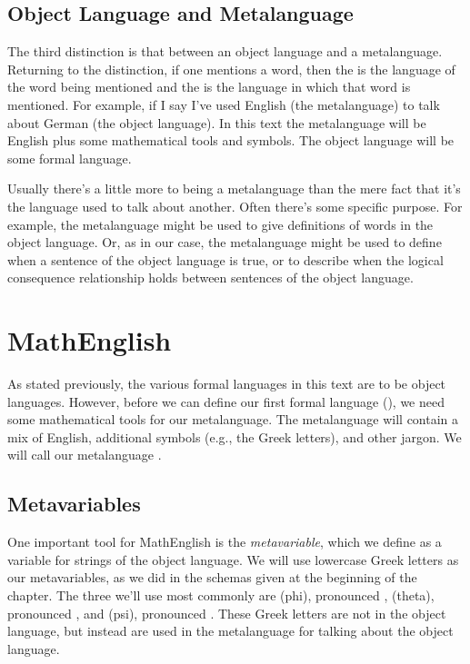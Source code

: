 \subsection{Object Language and Metalanguage}\label{objectandmetalanguage}
The third distinction is that between an object language and a metalanguage. 
Returning to the  distinction, if one mentions a word, then the  is the language of the word being mentioned and the  is the language in which that word is mentioned. 
For example, if I say  I've used English (the metalanguage) to talk about German (the object language). 
In this text the metalanguage will be English plus some mathematical tools and symbols. 
The object language will be some formal language. 

Usually there's a little more to being a metalanguage than the mere fact that it's the language used to talk about another. 
Often there's some specific purpose. 
For example, the metalanguage might be used to give definitions of words in the object language. Or, as in our case, the metalanguage might be used to define when a sentence of the object language is true, or to describe when the logical consequence relationship holds between sentences of the object language. 

\section{MathEnglish}\label{MathEnglish}

As stated previously, the various formal languages in this text are to be object languages.  However, before we can define our first formal language (\GSL{}), we need some mathematical tools for our metalanguage.  The metalanguage will contain a mix of English, additional symbols (e.g., the Greek letters), and other jargon.  We will call our metalanguage .   

\subsection{Metavariables}\label{metavariables}
One important tool for MathEnglish is the \emph{metavariable}, which we define as a variable for strings of the object language.  
We will use lowercase Greek letters as our metavariables, as we did in the schemas given at the beginning of the chapter.
The three we'll use most commonly are \mention{$\CAPPHI$} (phi), pronounced , \mention{$\CAPTHETA$} (theta), pronounced , and \mention{$\CAPPSI$} (psi), pronounced .
These Greek letters are not in the object language, but instead are used in the metalanguage for talking about the object language. 

